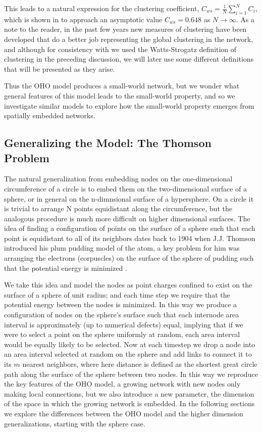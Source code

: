 \documentclass[aps,pre,reprint,superscriptaddress,amsmath,amssymb]{revtex4-1}
\begin{document}
\begin{description}
This leads to a natural expression for the clustering coefficient, $C_{ws} = \frac{1}{N} \sum_{i=1}^{N} C_i$, which is shown in \cite{ozik2004} to approach an asymptotic value $C_{ws} = 0.648$ as $N \to \infty$.
As a note to the reader, in the past few years new measures of clustering have been developed that do a better job representing the global clustering in the network, and although for consistency with \cite{ozik2004} we used the Watts-Strogatz definition of clustering in the preceding discussion, we will later use some different definitions that will be presented as they arise.
\end{description}
Thus the OHO model produces a small-world network, but we wonder what general features of this model leads to the small-world property, and so we investigate similar models to explore how the small-world property emerges from spatially embedded networks.

\subsection{Generalizing the Model: The Thomson Problem}
The natural generalization from embedding nodes on the one-dimensional circumference of a circle is to embed them on the two-dimensional surface of a sphere, or in general on the n-dimnsional surface of a hypersphere.
On a circle it is trivial to arrange N points equidistant along the circumference, but the analogous procedure is much more difficult on higher dimensional surfaces. 
The idea of finding a configuration of points on the surface of a sphere such that each point is equidistant to all of its neighbors dates back to 1904 when J.J. Thomson introduced his plum pudding model of the atom, a key problem for him was arranging the electrons (corpuscles) on the surface of the sphere of pudding such that the potential energy is minimized \cite{thomson1904}.

We take this idea and model the nodes as point charges confined to exist on the surface of a sphere of unit radius; and each time step we require that the potential energy between the nodes is minimized.
In this way we produce a configuration of nodes on the sphere's surface such that each internode area interval is approximately (up to numerical defects) equal, implying that if we were to select a point on the sphere uniformly at random, each area interval would be equally likely to be selected.
Now at each timestep we drop a node into an area interval selected at random on the sphere and add links to connect it to its $m$ nearest neighbors, where here distance is defined as the shortest great circle path along the surface of the sphere between two nodes.
In this way we reproduce the key features of the OHO model, a growing network with new nodes only making local connections, but we also introduce a new parameter, the dimension of the space in which the growing network is embedded.
In the following sections we explore the differences between the OHO model and the higher dimension generalizations, starting with the sphere case. 
\end{document}
